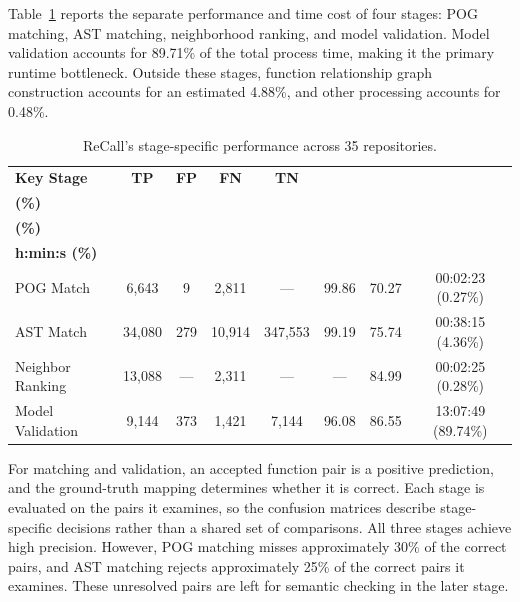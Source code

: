 Table~\ref{tab:rq1-stage} reports the separate performance and time cost of four stages: POG matching, AST matching, neighborhood ranking, and model validation. Model validation accounts for 89.71\% of the total process time, making it the primary runtime bottleneck. Outside these stages, function relationship graph construction accounts for an estimated 4.88\%, and other processing accounts for 0.48\%.

\begin{table}[htbp]
\caption{ReCall's stage-specific performance across 35 repositories.}
\label{tab:rq1-stage}
\centering\small
\setlength{\tabcolsep}{3pt}
\renewcommand{\arraystretch}{1.1}
\begin{tabular*}{0.93\linewidth}{@{\extracolsep{\fill}}lccccccc@{}}
\toprule
\textbf{Key Stage} & \textbf{TP} & \textbf{FP} & \textbf{FN} & \textbf{TN} & \begin{tabular}[c]{@{}c@{}}\textbf{Precision}\\\textbf{(\%)}\end{tabular} & \begin{tabular}[c]{@{}c@{}}\textbf{Recall}\\\textbf{(\%)}\end{tabular} & \begin{tabular}[c]{@{}c@{}}\textbf{Time Cost}\\\textbf{h:min:s (\%)}\end{tabular} \\
\midrule
POG Match & 6,643 & 9 & 2,811 & --- & 99.86 & 70.27 & 00:02:23 (0.27\%) \\
AST Match & 34,080 & 279 & 10,914 & 347,553 & 99.19 & 75.74 & 00:38:15 (4.36\%) \\
Neighbor Ranking & 13,088 & --- & 2,311 & --- & --- & 84.99 & 00:02:25 (0.28\%) \\
Model Validation & 9,144 & 373 & 1,421 & 7,144 & 96.08 & 86.55 & 13:07:49 (89.74\%) \\

\bottomrule
\end{tabular*}
\end{table}



For matching and validation, an accepted function pair is a positive prediction, and the ground-truth mapping determines whether it is correct. Each stage is evaluated on the pairs it examines, so the confusion matrices describe stage-specific decisions rather than a shared set of comparisons. All three stages achieve high precision. However, POG matching misses approximately 30\% of the correct pairs, and AST matching rejects approximately 25\% of the correct pairs it examines. These unresolved pairs are left for semantic checking in the later stage.


